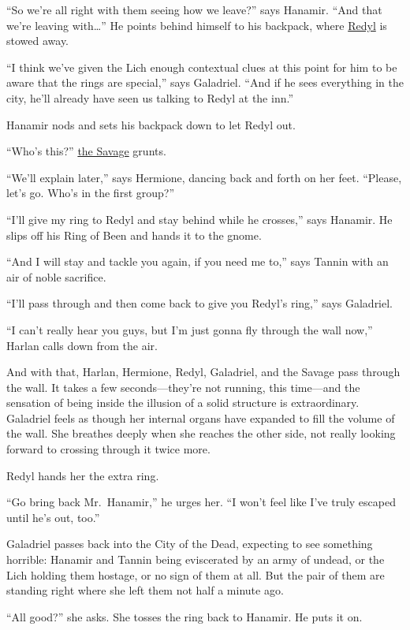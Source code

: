 \documentclass[smalldemyvopaper,11pt,twoside,onecolumn,openright,extrafontsizes]{memoir}
\begin{document}
``So we're all right with them seeing how we leave?'' says Hanamir.
``And that we're leaving with\ldots{}'' He points behind himself to his
backpack, where \href{/characters/redyl/}{Redyl} is stowed away.

``I think we've given the Lich enough contextual clues at this point for
him to be aware that the rings are special,'' says Galadriel. ``And if
he sees everything in the city, he'll already have seen us talking to
Redyl at the inn.''

Hanamir nods and sets his backpack down to let Redyl out.

``Who's this?'' \href{/characters/the-savage/}{the Savage} grunts.

``We'll explain later,'' says Hermione, dancing back and forth on her
feet. ``Please, let's go. Who's in the first group?''

``I'll give my ring to Redyl and stay behind while he crosses,'' says
Hanamir. He slips off his Ring of Been and hands it to the gnome.

``And I will stay and tackle you again, if you need me to,'' says Tannin
with an air of noble sacrifice.

``I'll pass through and then come back to give you Redyl's ring,'' says
Galadriel.

``I can't really hear you guys, but I'm just gonna fly through the wall
now,'' Harlan calls down from the air.

And with that, Harlan, Hermione, Redyl, Galadriel, and the Savage pass
through the wall. It takes a few seconds---they're not running, this
time---and the sensation of being inside the illusion of a solid
structure is extraordinary. Galadriel feels as though her internal
organs have expanded to fill the volume of the wall. She breathes deeply
when she reaches the other side, not really looking forward to crossing
through it twice more.

Redyl hands her the extra ring.

``Go bring back Mr.~Hanamir,'' he urges her. ``I won't feel like I've
truly escaped until he's out, too.''

Galadriel passes back into the City of the Dead, expecting to see
something horrible: Hanamir and Tannin being eviscerated by an army of
undead, or the Lich holding them hostage, or no sign of them at all. But
the pair of them are standing right where she left them not half a
minute ago.

``All good?'' she asks. She tosses the ring back to Hanamir. He puts it
on.
\end{document}
